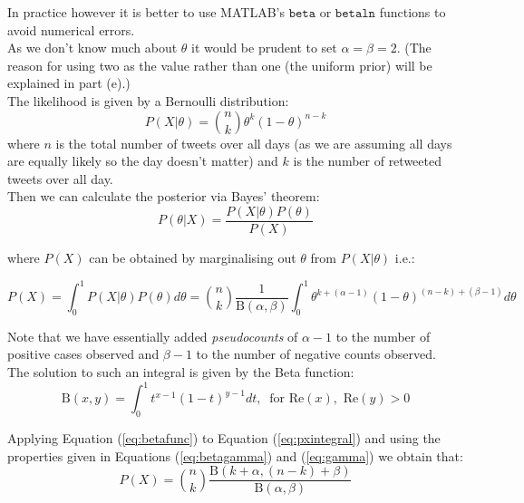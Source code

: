 \documentclass[paper=a4, fontsize=11pt]{scrartcl} %
\numberwithin{equation}{section} %
\numberwithin{figure}{section} %
\numberwithin{table}{section} %
\begin{document}
In practice however it is better to use MATLAB's $\texttt{beta}$ or $\texttt{betaln}$ functions to avoid numerical errors.\\

As we don't know much about $\theta$ it would be prudent to set $\alpha = \beta = 2$. (The reason for using two as the value rather than one (the uniform prior) will be explained in part (e).)\\

The likelihood is given by a Bernoulli distribution:
\begin{equation}
P(X | \theta) = \binom{n}{k} \theta^k (1-\theta)^{n-k}
\end{equation}
where $n$ is the total number of tweets over all days (as we are assuming all days are equally likely so the day doesn't matter) and $k$ is the number of retweeted tweets over all day.\\

Then we can calculate the posterior via Bayes' theorem:
\begin{equation}
P(\theta | X) = \frac{ P(X | \theta) P(\theta) }{P(X)} \label{eq:bayestheorem}
\end{equation}

where $P(X)$ can be obtained by marginalising out $\theta$ from $P(X | \theta)$ i.e.:

\begin{equation}
P(X) = \int^1_0 P(X|\theta)P(\theta)d\theta = \binom{n}{k} \frac{1}{\textrm{B}(\alpha,\beta)} \int^1_0 \theta^{k+(\alpha -1)} (1-\theta)^{(n-k)+ (\beta - 1)} d\theta
\label{eq:pxintegral}
\end{equation}

Note that we have essentially added \textit{pseudocounts} of $\alpha-1$ to the number of positive cases observed and $\beta-1$ to the number of negative counts observed.\\


The solution to such an integral is given by the Beta function:
\begin{equation}
\textrm{B}(x,y) = \int^1_0 t^{x-1}(1-t)^{y-1}dt  , ~\textrm{ for Re}(x),\textrm{ Re}(y) >0
\label{eq:betafunc}
\end{equation}
 
 Applying Equation (\ref{eq:betafunc}) to Equation (\ref{eq:pxintegral}) and using the properties given in Equations (\ref{eq:betagamma}) and (\ref{eq:gamma})  we obtain that:
 \begin{equation}
 P(X) =  \binom{n}{k} \frac{\textrm{B}(k+\alpha, (n-k)+\beta)}{\textrm{B}(\alpha,\beta)}
 \end{equation}
\end{document}

